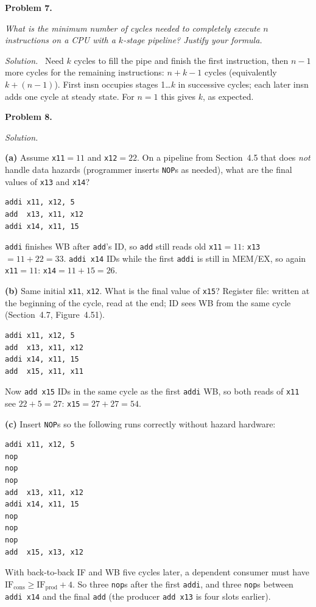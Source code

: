 \documentclass[12pt]{article}
\newcommand{\problem}[1]{\vspace{0.8em}\noindent\textbf{Problem #1.}\vspace{0.35em}}
\newenvironment{solution}{\par\noindent\textit{Solution.}\ }{\par\vspace{1.1em}}
\newcommand{\subproblem}[1]{\par\vspace{0.45em}\noindent\textbf{#1}\quad}
\newcommand{\assigntext}[1]{\par\vspace{0.25em}\small\textit{#1}\par\vspace{0.35em}}
\begin{document}
\problem{7}
\assigntext{What is the minimum number of cycles needed to completely execute $n$ instructions on a CPU with a $k$-stage pipeline? Justify your formula.}

\begin{solution}
Need $k$ cycles to fill the pipe and finish the first instruction, then $n-1$ more cycles for the remaining instructions: $\boxed{n+k-1}$ cycles (equivalently $k+(n-1)$). First insn occupies stages 1\ldots $k$ in successive cycles; each later insn adds one cycle at steady state. For $n=1$ this gives $k$, as expected.
\end{solution}

\problem{8}
\begin{solution}
\subproblem{(a)}
Assume \texttt{x11}$=11$ and \texttt{x12}$=22$. On a pipeline from Section~4.5 that does \emph{not} handle data hazards (programmer inserts \texttt{NOP}s as needed), what are the final values of \texttt{x13} and \texttt{x14}?
\begin{verbatim}
addi x11, x12, 5
add  x13, x11, x12
addi x14, x11, 15
\end{verbatim}
\texttt{addi} finishes WB after \texttt{add}'s ID, so \texttt{add} still reads old \texttt{x11}$=11$: \texttt{x13}$=11+22=33$. \texttt{addi x14} IDs while the first \texttt{addi} is still in MEM/EX, so again \texttt{x11}$=11$: \texttt{x14}$=11+15=26$.

\subproblem{(b)}
Same initial \texttt{x11}, \texttt{x12}. What is the final value of \texttt{x15}? Register file: written at the beginning of the cycle, read at the end; ID sees WB from the same cycle (Section~4.7, Figure~4.51).
\begin{verbatim}
addi x11, x12, 5
add  x13, x11, x12
addi x14, x11, 15
add  x15, x11, x11
\end{verbatim}
Now \texttt{add x15} IDs in the same cycle as the first \texttt{addi} WB, so both reads of \texttt{x11} see $22+5=27$: \texttt{x15}$=27+27=54$.

\subproblem{(c)}
Insert \texttt{NOP}s so the following runs correctly without hazard hardware:
\begin{verbatim}
addi x11, x12, 5
nop
nop
nop
add  x13, x11, x12
addi x14, x11, 15
nop
nop
nop
add  x15, x13, x12
\end{verbatim}
With back-to-back IF and WB five cycles later, a dependent consumer must have $\mathrm{IF}_{\mathrm{cons}}\ge \mathrm{IF}_{\mathrm{prod}}+4$. So three \texttt{nop}s after the first \texttt{addi}, and three \texttt{nop}s between \texttt{addi x14} and the final \texttt{add} (the producer \texttt{add x13} is four slots earlier).
\end{solution}
\end{document}
